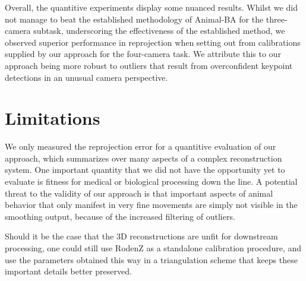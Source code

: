 \documentclass[sigconf, nonacm]{acmart}
\begin{document}

Overall, the quantitive experiments display some nuanced results. Whilst we did not manage to beat the established methodology of Animal-BA for the three-camera subtask, underscoring the effectiveness of the established method, we observed superior performance in reprojection when setting out from  calibrations supplied by our approach for the four-camera task. We attribute this to our approach being more robust to outliers that result from overconfident keypoint detections in an unusual camera perspective.\par


\section{Limitations}
We only measured the reprojection error for a quantitive evaluation of our approach, which summarizes over many aspects of a complex reconstruction system. One important quantity that we did not have the opportunity yet to evaluate is fitness for medical or biological processing down the line. A potential threat to the validity of our approach is that important aspects of animal behavior that only manifest in very fine movements are simply not visible in the smoothing output, because of the increased filtering of outliers. \par
Should it be the case that the 3D reconstructions are unfit for downstream processing, one could still use RodenZ as a standalone calibration procedure, and use the parameters obtained this way in a triangulation scheme that keeps these important details better preserved. \par
\end{document}
